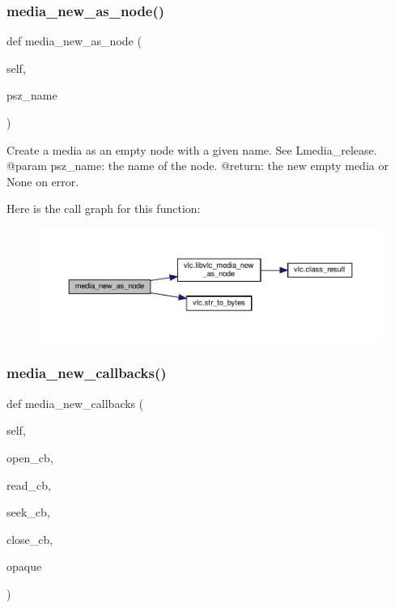 \subsubsection{\texorpdfstring{media\+\_\+new\+\_\+as\+\_\+node()}{media\_new\_as\_node()}}
{\footnotesize\ttfamily def media\+\_\+new\+\_\+as\+\_\+node (\begin{DoxyParamCaption}\item[{}]{self,  }\item[{}]{psz\+\_\+name }\end{DoxyParamCaption})}

\begin{DoxyVerb}Create a media as an empty node with a given name.
See L{media_release}.
@param psz_name: the name of the node.
@return: the new empty media or None on error.
\end{DoxyVerb}
 Here is the call graph for this function\+:
\nopagebreak
\begin{figure}[H]
\begin{center}
\leavevmode
\includegraphics[width=350pt]{classvlc_1_1_instance_ab99461d314ff3b327e2beca5816ec1ad_cgraph}
\end{center}
\end{figure}
\mbox{\label{classvlc_1_1_instance_af8c03950a560c8a328a96276bd990d1f}} 
\subsubsection{\texorpdfstring{media\+\_\+new\+\_\+callbacks()}{media\_new\_callbacks()}}
{\footnotesize\ttfamily def media\+\_\+new\+\_\+callbacks (\begin{DoxyParamCaption}\item[{}]{self,  }\item[{}]{open\+\_\+cb,  }\item[{}]{read\+\_\+cb,  }\item[{}]{seek\+\_\+cb,  }\item[{}]{close\+\_\+cb,  }\item[{}]{opaque }\end{DoxyParamCaption})}

